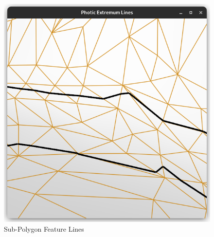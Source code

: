 \documentclass[9pt,fleqn,twoside,twocolumn]{stdglobal}
\begin{document}
    \begin{figure}[h]
      \centering
      \includegraphics[width=0.8\linewidth,trim={15px 15 15 50},clip]{images/subpolygon-lines.png}
      \caption{Sub-Polygon Feature Lines}
    \end{figure}
\end{document}
